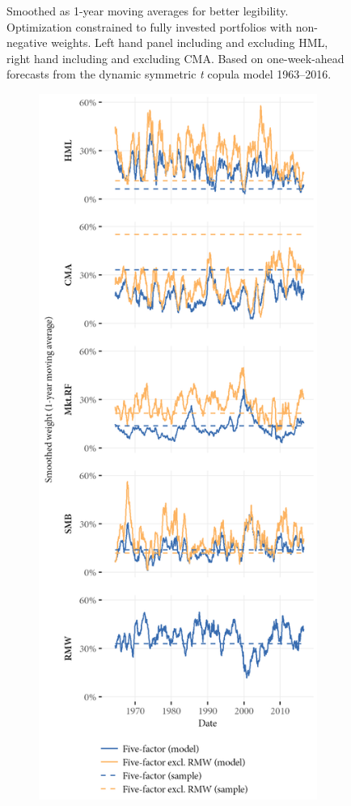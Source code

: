 \begin{figure}[p]
  \begin{longcaption}
    Smoothed as 1-year moving averages for better legibility. Optimization constrained to fully invested portfolios with non-negative weights. Left hand panel including and excluding HML, right hand including and excluding CMA. Based on one-week-ahead forecasts from the dynamic symmetric \emph{t} copula model 1963--2016.
  \end{longcaption}
\end{figure}
\begin{figure}[p]
  \ContinuedFloat
  \centering
  \begin{subfigure}{0.45\textwidth}
    \includegraphics[width=\textwidth]{graphics/weights/main_Weights_MV_5F_5F_EXCL_RMW.png}

\end{subfigure}
\end{figure}
